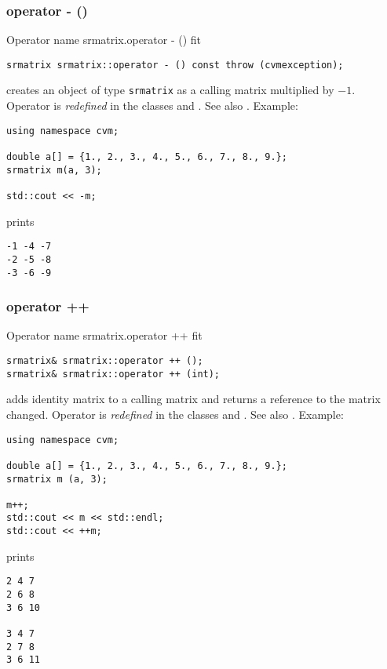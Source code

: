 \subsubsection{operator - ()}
Operator%
\pdfdest name {srmatrix.operator - ()} fit
\begin{verbatim}
srmatrix srmatrix::operator - () const throw (cvmexception);
\end{verbatim}
creates an object of type \verb"srmatrix" as
a calling matrix multiplied by $-1$.
Operator is \emph{redefined} in the classes
and .
See also .
Example:
\begin{Verbatim}
using namespace cvm;

double a[] = {1., 2., 3., 4., 5., 6., 7., 8., 9.};
srmatrix m(a, 3);

std::cout << -m;
\end{Verbatim}
prints
\begin{Verbatim}
-1 -4 -7
-2 -5 -8
-3 -6 -9
\end{Verbatim}
\newpage



\subsubsection{operator ++}
Operator%
\pdfdest name {srmatrix.operator ++} fit
\begin{verbatim}
srmatrix& srmatrix::operator ++ ();
srmatrix& srmatrix::operator ++ (int);
\end{verbatim}
adds identity matrix to a calling matrix
and returns a reference to
the matrix changed.
Operator is \emph{redefined} in the classes
 and .
See also .
Example:
\begin{Verbatim}
using namespace cvm;

double a[] = {1., 2., 3., 4., 5., 6., 7., 8., 9.};
srmatrix m (a, 3);

m++;
std::cout << m << std::endl;
std::cout << ++m;
\end{Verbatim}
prints
\begin{Verbatim}
2 4 7
2 6 8
3 6 10

3 4 7
2 7 8
3 6 11
\end{Verbatim}
\newpage



